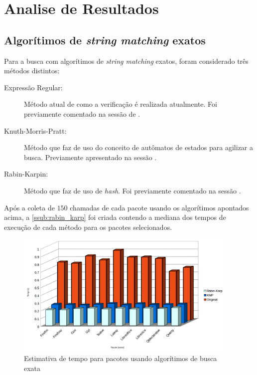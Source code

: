 
\chapter{Analise de Resultados} %
\label{cha:analise_de_resultados}

\section{Algorítimos de \textit{string matching} exatos} %
\label{sec:algor_timos_de_string_matching_exatos}

Para a busca com algorítimos de \textit{string matching} exatos, foram considerado três métodos distintos:

\begin{description}
	\item[Expressão Regular:] Método atual de como a verificação é realizada atualmente. Foi previamente comentado na sessão de .
	\item[Knuth-Morris-Pratt:] Método que faz de uso do conceito de autômatos de estados para agilizar a busca. Previamente apresentado na sessão .
	\item[Rabin-Karpin:]  Método que faz de uso de \textit{hash}. Foi previamente comentado na sessão .
\end{description}

Após a coleta de $150$ chamadas de cada pacote usando os algorítimos apontados acima, a \autoref{ssub:rabin_karp} foi criada contendo a mediana dos tempos de execução de cada método para os pacotes selecionados.

\begin{figure}[htbp]
  \centering
  \includegraphics[width=0.95\textwidth]{figuras/tempo-rk_kmp_std}
  \caption{Estimativa de tempo para pacotes usando algorítimos de busca exata}
  \label{tempo_rk_kmp_std}
\end{figure}

